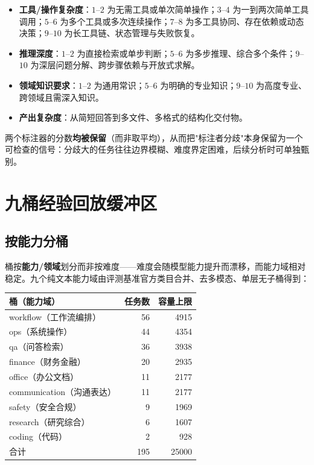 \begin{itemize}
  \item \textbf{工具/操作复杂度}：$1$--$2$ 为无需工具或单次简单操作；$3$--$4$ 为一到两次简单工具调用；$5$--$6$ 为多个工具或多次连续操作；$7$--$8$ 为多工具协同、存在依赖或动态决策；$9$--$10$ 为长工具链、状态管理与失败恢复。
  \item \textbf{推理深度}：$1$--$2$ 为直接检索或单步判断；$5$--$6$ 为多步推理、综合多个条件；$9$--$10$ 为深层问题分解、跨步骤依赖与开放式求解。
  \item \textbf{领域知识要求}：$1$--$2$ 为通用常识；$5$--$6$ 为明确的专业知识；$9$--$10$ 为高度专业、跨领域且需深入知识。
  \item \textbf{产出复杂度}：从简短回答到多文件、多格式的结构化交付物。
\end{itemize}

两个标注器的分数\textbf{均被保留}（而非取平均），从而把"标注者分歧"本身保留为一个可检查的信号：分歧大的任务往往边界模糊、难度界定困难，后续分析时可单独甄别。

\section{九桶经验回放缓冲区}
\label{sec:buffer}

\subsection{按能力分桶}

桶按\textbf{能力/领域}划分而非按难度——难度会随模型能力提升而漂移，而能力域相对稳定。九个纯文本能力域由评测基准官方类目合并、去多模态、单层无子桶得到：

\begin{center}
\begin{tabular}{lrr}
\toprule
桶（能力域） & 任务数 & 容量上限 \\
\midrule
workflow（工作流编排） & 56 & 4915 \\
ops（系统操作） & 44 & 4354 \\
qa（问答检索） & 36 & 3938 \\
finance（财务金融） & 20 & 2935 \\
office（办公文档） & 11 & 2177 \\
communication（沟通表达） & 11 & 2177 \\
safety（安全合规） & 9 & 1969 \\
research（研究综合） & 6 & 1607 \\
coding（代码） & 2 & 928 \\
\midrule
合计 & 195 & 25000 \\
\bottomrule
\end{tabular}
\end{center}

